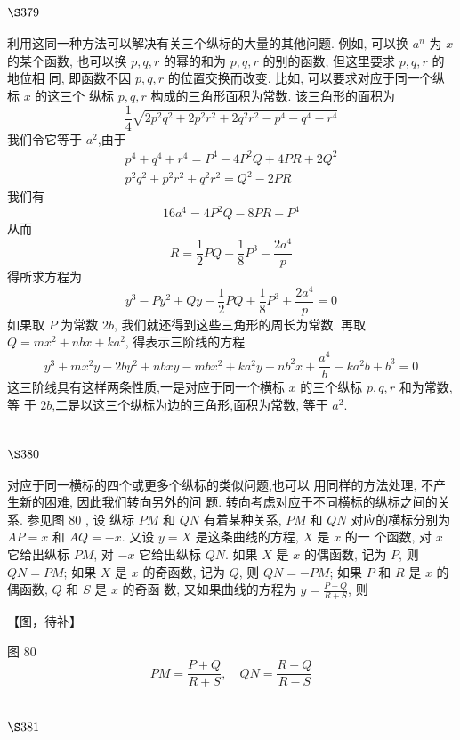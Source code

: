 \section{$\S 379$}

利用这同一种方法可以解决有关三个纵标的大量的其他问题. 例如, 可以换 $a^{n}$ 为 $x$ 的某个函数, 也可以换 $p, q, r$ 的幂的和为 $p, q, r$ 的别的函数, 但这里要求 $p, q, r$ 的地位相 同, 即函数不因 $p, q, r$ 的位置交换而改变. 比如, 可以要求对应于同一个纵标 $x$ 的这三个 纵标 $p, q, r$ 构成的三角形面积为常数. 该三角形的面积为
\[
\frac{1}{4} \sqrt{2 p^{2} q^{2}+2 p^{2} r^{2}+2 q^{2} r^{2}-p^{4}-q^{4}-r^{4}}
\]
我们令它等于 $a^{2}$,由于
\[
\begin{gathered}
p^{4}+q^{4}+r^{4}=P^{4}-4 P^{2} Q+4 P R+2 Q^{2} \\
p^{2} q^{2}+p^{2} r^{2}+q^{2} r^{2}=Q^{2}-2 P R
\end{gathered}
\]
我们有
\[
16 a^{4}=4 P^{2} Q-8 P R-P^{4}
\]
从而
\[
R=\frac{1}{2} P Q-\frac{1}{8} P^{3}-\frac{2 a^{4}}{p}
\]
得所求方程为
\[
y^{3}-P y^{2}+Q y-\frac{1}{2} P Q+\frac{1}{8} P^{3}+\frac{2 a^{4}}{p}=0
\]
如果取 $P$ 为常数 $2 b$, 我们就还得到这些三角形的周长为常数. 再取 $Q=m x^{2}+n b x+k a^{2}$, 得表示三阶线的方程
\[
y^{3}+m x^{2} y-2 b y^{2}+n b x y-m b x^{2}+k a^{2} y-n b^{2} x+\frac{a^{4}}{b}-k a^{2} b+b^{3}=0
\]
这三阶线具有这样两条性质,一是对应于同一个横标 $x$ 的三个纵标 $p, q, r$ 和为常数,等 于 $2 b$,二是以这三个纵标为边的三角形,面积为常数, 等于 $a^{2}$. 

\section{$\S 380$}

对应于同一横标的四个或更多个纵标的类似问题,也可以 用同样的方法处理, 不产生新的困难, 因此我们转向另外的问 题. 转向考虑对应于不同横标的纵标之间的关系. 参见图 80 , 设 纵标 $P M$ 和 $Q N$ 有着某种关系, $P M$ 和 $Q N$ 对应的横标分别为 $A P=x$ 和 $A Q=-x$. 又设 $y=X$ 是这条曲线的方程, $X$ 是 $x$ 的一 个函数, 对 $x$ 它给出纵标 $P M$, 对 $-x$ 它给出纵标 $Q N$. 如果 $X$ 是 $x$ 的偶函数, 记为 $P$, 则 $Q N=P M$; 如果 $X$ 是 $x$ 的奇函数, 记为 $Q$, 则 $Q N=-P M$; 如果 $P$ 和 $R$ 是 $x$ 的偶函数, $Q$ 和 $S$ 是 $x$ 的奇函 数, 又如果曲线的方程为 $y=\frac{P+Q}{R+S}$, 则


【图，待补】

图 80
\[
P M=\frac{P+Q}{R+S}, \quad Q N=\frac{R-Q}{R-S}
\]
\section{$\S 381$}

